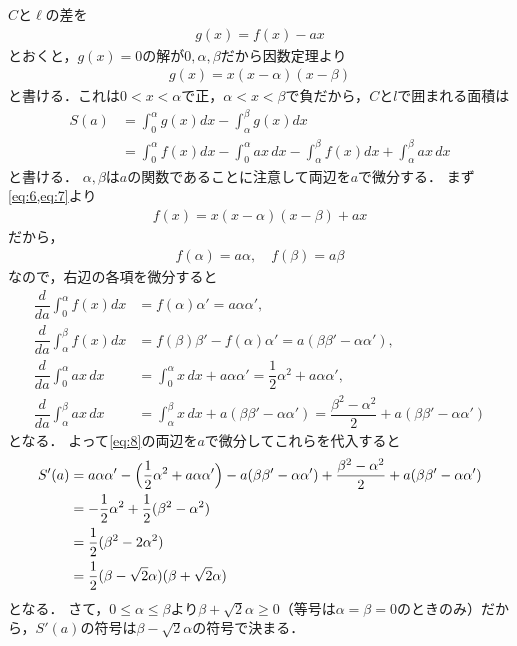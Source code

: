 \documentclass[../../main.tex]{subfiles}
\begin{document}
$C$と$\ell$の差を
\begin{align}
  g(x) = f(x) - ax \label{eq:6}
\end{align}
とおくと，$g(x)=0$の解が$0,\alpha,\beta$だから因数定理より
\begin{align}
  g(x) = x(x-\alpha)(x-\beta) \label{eq:7}
\end{align}
と書ける．これは$0<x<\alpha$で正，$\alpha<x<\beta$で負だから，$C$と$l$で囲まれる面積は
\begin{align}
  S(a)
  &=\int_0^\alpha g(x)dx-\int_\alpha^\beta g(x)dx \\
  &=\int_0^\alpha f(x)dx-\int_0^\alpha ax\,dx-\int_\alpha^\beta f(x)dx+\int_\alpha^\beta ax\,dx \label{eq:8}
\end{align}
と書ける．
$\alpha,\beta$は$a$の関数であることに注意して両辺を$a$で微分する．
まず\cref{eq:6,eq:7}より
\begin{align}
  f(x) = x(x-\alpha)(x-\beta) + ax
\end{align}
だから，
\begin{align}
  f(\alpha)=a\alpha, \quad f(\beta)=a\beta \label{eq:9}
\end{align}
なので，右辺の各項を微分すると
\begin{align}
  \dfrac{d}{da}\int_0^\alpha f(x)dx&=f(\alpha)\alpha'=a\alpha\alpha',\\
  \dfrac{d}{da}\int_\alpha^\beta f(x)dx&=f(\beta)\beta'-f(\alpha)\alpha'=a(\beta\beta'-\alpha\alpha'),\\
  \dfrac{d}{da}\int_0^\alpha ax\,dx&=\int_0^\alpha x\,dx+a\alpha\alpha'=\dfrac{1}{2}\alpha^2+a\alpha\alpha',\\
  \dfrac{d}{da}\int_\alpha^\beta ax\,dx&=\int_\alpha^\beta x\,dx+a(\beta\beta'-\alpha\alpha') = \dfrac{\beta^2-\alpha^2}{2} +a(\beta\beta'-\alpha\alpha')
\end{align}
となる．
よって\cref{eq:8}の両辺を$a$で微分してこれらを代入すると
\begin{align}
  S'(a)
  &=a\alpha\alpha'-\Bigl(\dfrac{1}{2}\alpha^2+a\alpha\alpha'\Bigr)-a(\beta\beta'-\alpha\alpha')+\dfrac{\beta^2-\alpha^2}{2}+a(\beta\beta'-\alpha\alpha')\\
  &=-\dfrac{1}{2}\alpha^2+\dfrac{1}{2}(\beta^2-\alpha^2) \\
  &=\dfrac{1}{2}(\beta^2-2\alpha^2) \\
  &=\dfrac{1}{2}(\beta-\sqrt{2}\alpha)(\beta+\sqrt{2}\alpha) \label{eq:10}
\end{align}
となる．
さて，$0\le\alpha\le\beta$より$\beta+\sqrt{2}\alpha\ge0$（等号は$\alpha=\beta=0$のときのみ）だから，$S'(a)$の符号は$\beta-\sqrt{2}\alpha$の符号で決まる．
\end{document}
